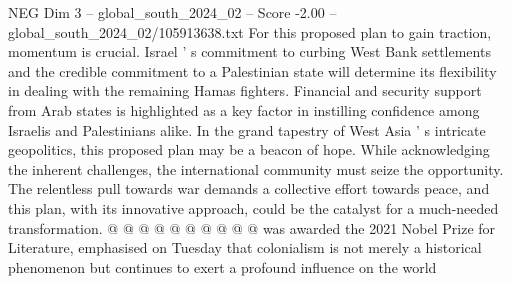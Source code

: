 \begin{textsample}{NEG Dim 3 – global\_south\_2024\_02 – Score -2.00 – global\_south\_2024\_02/105913638.txt}
For this proposed plan to gain traction, momentum is crucial.
Israel ' s commitment to curbing West Bank settlements and the credible commitment to a Palestinian state will determine its flexibility in dealing with the remaining Hamas fighters.
Financial and security support from Arab states is highlighted as a key factor in instilling confidence among Israelis and Palestinians alike.
In the grand tapestry of West Asia ' s intricate geopolitics, this proposed plan may be a beacon of hope.
While acknowledging the inherent challenges, the international community must seize the opportunity.
The relentless pull towards war demands a collective effort towards peace, and this plan, with its innovative approach, could be the catalyst for a much-needed transformation. @ @ @ @ @ @ @ @ @ @ was awarded the 2021 Nobel Prize for Literature, emphasised on Tuesday that colonialism is not merely a historical phenomenon but continues to exert a profound influence on the world

\end{textsample}
